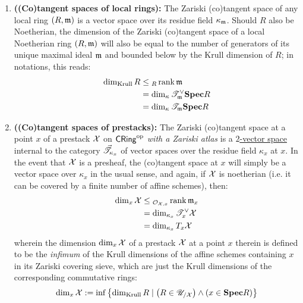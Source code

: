             \begin{proposition} \label{prop: Zariski_tangent_spaces_are_vector_spaces} 
                \noindent
                \begin{enumerate}
                    \item \textbf{\textbf{((Co)tangent spaces of local rings):}} The Zariski (co)tangent space of any local ring $(R, \mathfrak{m})$ is a vector space over its residue field $\kappa_{\mathfrak{m}}$. Should $R$ also be Noetherian, the dimension of the Zariski (co)tangent space of a local Noetherian ring $(R, \mathfrak{m})$ will also be equal to the number of generators of its unique maximal ideal $\mathfrak{m}$ and bounded below by the Krull dimension of $R$; in notations, this reads:
                        $$
                            \begin{aligned}
                                \dim_{\mathrm{Krull}} R & \leq {}_R\operatorname{rank} \mathfrak{m}
                                \\
                                & = \dim_{\kappa} \mathscr{T}^{\vee}_{\mathfrak{m}} \mathbf{Spec} R
                                \\
                                & = \dim_{\kappa} \mathscr{T}_{\mathfrak{m}} \mathbf{Spec} R
                            \end{aligned}
                        $$
                    \item \textbf{((Co)tangent spaces of prestacks):} The Zariski (co)tangent space at a point $x$ of a prestack $\mathcal{X}$ on $\mathsf{CRing}^{\mathrm{op}}$ \textit{with a Zariski atlas} is a \href{https://ncatlab.org/nlab/show/2-vector+space}{\underline{$2$-vector space}} internal to the category $\Vec{\mathscr{T}}_{\kappa_x}$ of vector spaces over the residue field $\kappa_x$ at $x$. In the event that $\mathcal{X}$ is a presheaf, the (co)tangent space at $x$ will simply be a vector space over $\kappa_x$ in the usual sense, and again, if $\mathcal{X}$ is noetherian (i.e. it can be covered by a finite number of affine schemes), then:
                        $$
                            \begin{aligned}
                                \dim_x \mathcal{X} & \leq {}_{\mathcal{O}_{\mathcal{X}, x}}\operatorname{rank} \mathfrak{m}_x
                                \\
                                & = \dim_{\kappa_x} \mathscr{T}^{\vee}_x \mathcal{X}
                                \\
                                & = \dim_{\kappa_x} T_x \mathcal{X}
                            \end{aligned}
                        $$
                    wherein the dimension $\dim_x \mathcal{X}$ of a prestack $\mathcal{X}$ at a point $x$ therein is defined to be the \textit{infimum} of the Krull dimensions of the affine schemes containing $x$ in its Zariski covering sieve, which are just the Krull dimensions of the corresponding commutative rings:
                        $$\dim_x \mathcal{X} := \inf \left\{ \dim_{\mathrm{Krull}} R \mid \left(R \in \mathscr{U}_{/\mathcal{X}}\right) \wedge (x \in \mathbf{Spec} R) \right\}$$
                \end{enumerate}
            \end{proposition}
